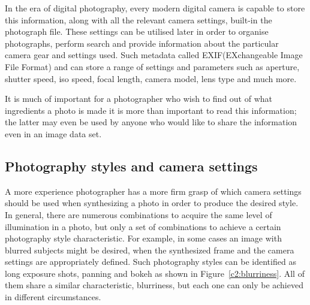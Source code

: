 In the era of digital photography, every modern digital camera is capable to store this information, along with all the relevant camera settings, built-in the photograph file. These settings can be utilised later in order to organise photographs, perform search and provide information about the particular camera gear and settings used.
Such metadata called EXIF(EXchangeable Image File Format) and can store a range of settings and parameters such as aperture, shutter speed, iso speed, focal length, camera model, lens type and much more.

It is much of important for a photographer who wish to find out of what ingredients a photo is made it is more than important to read this information; the latter may even be used by anyone who would like to share the information even in an image data set.

\subsection{Photography styles and camera settings}

A more experience photographer has a more firm grasp of which camera settings should be used when synthesizing a photo in order to produce the desired style. In general, there are numerous combinations to acquire the same level of illumination in a photo, but only a set of combinations to achieve a certain photography style characteristic. 
For example, in some cases an image with blurred subjects might be desired, when the synthesized frame and the camera settings are appropriately defined.
Such photography styles can be identified as long exposure shots, panning and bokeh as shown in Figure~\ref{c2:blurriness}. All of them share a similar characteristic, blurriness, but each one can only be achieved in different circumstances.

